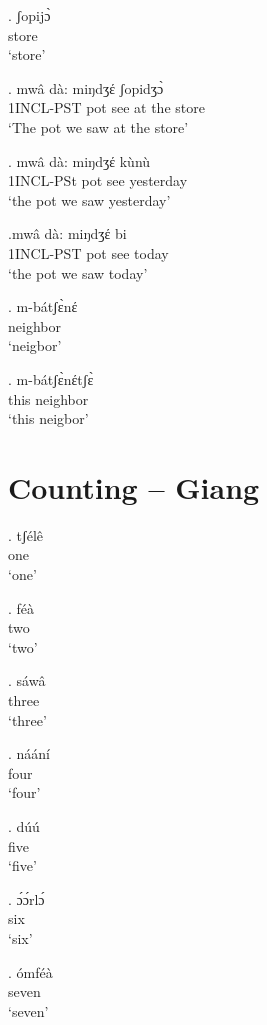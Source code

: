 \documentclass{assets/fieldnotes}
\begin{document}
\exg. ʃopijɔ̀\\
store\\
`store'

\exg. mwâ dà: miŋdʒέ ʃopidʒɔ̀\\ 
1INCL-PST pot see at the store\\ 
`The pot we saw at the store'

\exg. mwâ dà: miŋdʒέ kùnù\\
1INCL-PSt pot see yesterday\\
`the pot we saw yesterday'

\exg.mwâ dà: miŋdʒέ bi\\
1INCL-PST pot see today\\
`the pot we saw today'

\exg. m-bátʃɛ̀nέ\\
neighbor\\
 `neigbor'
 
\exg. m-bátʃɛ̀nέtʃɛ̀\\
this neighbor\\
 `this neigbor'

 

\section{Counting -- Giang} 

\exg. tʃélê\\
one\\
`one'

\exg. féà\\
two\\
`two'

\exg. sáwâ\\
three\\
`three'

\exg. náání\\
four\\
`four'

\exg. dúú\\
five\\
`five'

\exg. ɔ́ɔ́rlɔ́\\
six\\
`six'

\exg. ómféà\\
seven\\
`seven'
\end{document}
